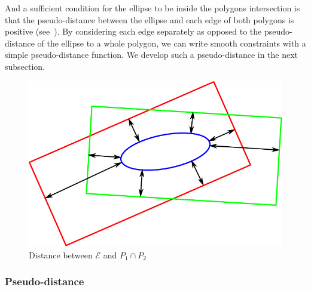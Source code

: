 And a sufficient condition for the ellipse to be inside the polygons intersection is that the pseudo-distance between the ellipse and each edge of both polygons is positive (see~).
By considering each edge separately as opposed to the pseudo-distance of the ellipse to a whole polygon, we can write smooth constraints with a simple pseudo-distance function.
We develop such a pseudo-distance in the next subsection.
%
\begin{figure}[!htb]
  \centering
  \includegraphics[width=0.2\columnwidth]{distance.pdf}
  \caption{Distance between $\mathcal{E}$ and $P_1 \cap P_2$}
\label{fig:distance}
\end{figure}

\subsubsection{Pseudo-distance}
\label{subsubsec:formulation}


